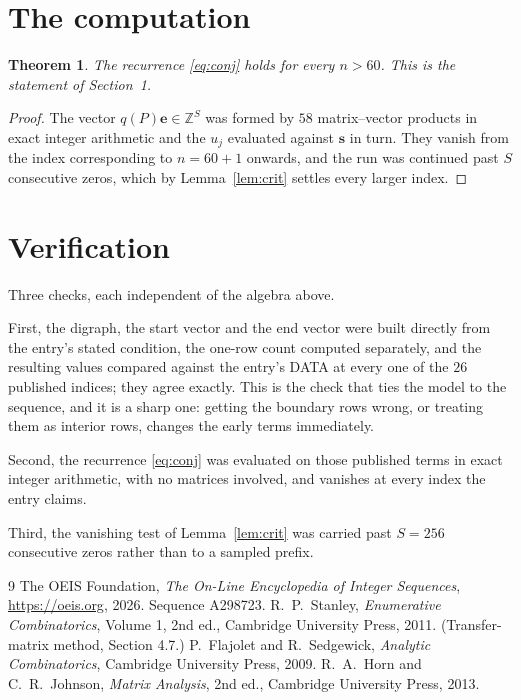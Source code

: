 \documentclass[11pt,a4paper]{article}
\theoremstyle{plain}
\newtheorem{theorem}{Theorem}
\theoremstyle{definition}
\begin{document}
\section{The computation}

\begin{theorem}
The recurrence \eqref{eq:conj} holds for every $n>60$. This is the statement of
Section~1.
\end{theorem}

\begin{proof}
The vector $q(P)\mathbf{e}\in\mathbb{Z}^{S}$ was formed by $58$ matrix--vector
products in exact integer arithmetic and the $u_j$ evaluated against $\mathbf{s}$ in turn.
They vanish from the index corresponding to $n=60+1$ onwards, and the run was continued
past $S$ consecutive zeros, which by Lemma~\ref{lem:crit} settles every larger index.
\end{proof}

\section{Verification}

Three checks, each independent of the algebra above.

First, the digraph, the start vector and the end vector were built directly from the
entry's stated condition, the one-row count computed separately, and the resulting values
compared against the entry's DATA at every one of the $26$ published indices; they
agree exactly. This is the check that ties the model to the sequence, and it is a sharp one:
getting the boundary rows wrong, or treating them as interior rows, changes the early terms
immediately.

Second, the recurrence \eqref{eq:conj} was evaluated on those published terms in exact
integer arithmetic, with no matrices involved, and vanishes at every index the entry claims.

Third, the vanishing test of Lemma~\ref{lem:crit} was carried past $S=256$ consecutive
zeros rather than to a sampled prefix.

\begin{thebibliography}{9}
 The OEIS Foundation, \emph{The On-Line Encyclopedia of Integer
Sequences}, \url{https://oeis.org}, 2026. Sequence A298723.
 R.~P.~Stanley, \emph{Enumerative Combinatorics}, Volume 1, 2nd ed.,
Cambridge University Press, 2011. (Transfer-matrix method, Section 4.7.)
 P.~Flajolet and R.~Sedgewick, \emph{Analytic Combinatorics}, Cambridge
University Press, 2009.
 R.~A.~Horn and C.~R.~Johnson, \emph{Matrix Analysis}, 2nd ed., Cambridge
University Press, 2013.
\end{thebibliography}
\end{document}
